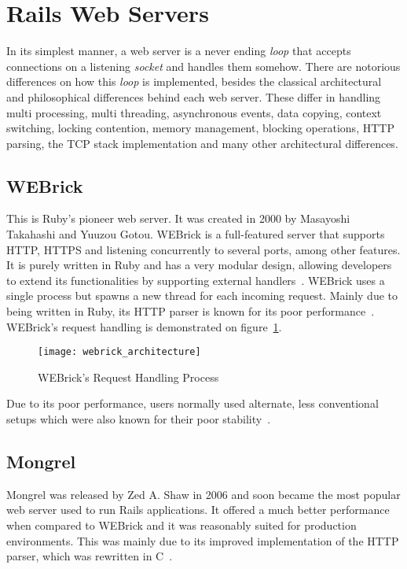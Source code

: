 \section{Rails Web Servers} %
\label{tech:sec:rails_webservers}
In its simplest manner, a web server is a never ending \textit{loop} that accepts connections on a listening \textit{socket} and handles them somehow. There are notorious differences on how this \textit{loop} is implemented, besides the classical architectural and philosophical differences behind each web server. These differ in handling multi processing, multi threading, asynchronous events, data copying, context switching, locking contention, memory management, blocking operations, HTTP parsing, the TCP stack implementation and many other architectural differences.


\subsection{WEBrick}
This is Ruby's pioneer web server. It was created in 2000 by Masayoshi Takahashi and Yuuzou Gotou. WEBrick is a full-featured server that supports HTTP, HTTPS and listening concurrently to several ports, among other features. It is purely written in Ruby and has a very modular design, allowing developers to extend its functionalities by supporting external handlers~\cite{webrick_guide}.
WEBrick uses a single process but spawns a new thread for each incoming request. Mainly due to being written in Ruby, its HTTP parser is known for its poor performance~\cite{ruby_webservers}. WEBrick's request handling is demonstrated on figure~\ref{fig:webrick_architecture}.
\begin{figure}[h!t]
  \centering
    \texttt{[image: webrick\_architecture]}
    \caption{WEBrick's Request Handling Process} \label{fig:webrick_architecture}
\end{figure}
Due to its poor performance, users normally used alternate, less conventional setups which were also known for their poor stability~\cite{ruby_webservers}.


\subsection{Mongrel}
Mongrel was released by Zed A. Shaw in 2006 and soon became the most popular web server used to run Rails applications. It offered a much better performance when compared to WEBrick and it was reasonably suited for production environments. This was mainly due to its improved implementation of the HTTP parser, which was rewritten in C~\cite{mongrel_server_production}.

